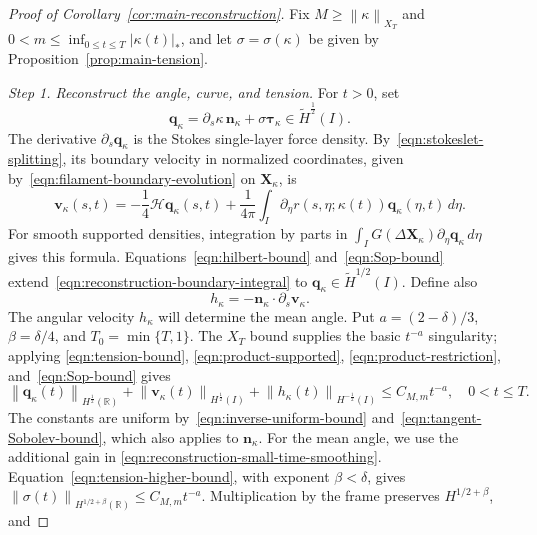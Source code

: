 \documentclass[11pt,reqno]{amsart}
\theoremstyle{plain}
\theoremstyle{definition}
\numberwithin{equation}{section}
\newcommand{\p}{\partial}
\newcommand{\mc}[1]{\mathcal{#1}}
\newcommand{\wt}[1]{\widetilde{#1}}
\newcommand{\bm}[1]{\boldsymbol{#1}}
\newcommand{\abs}[1]{\left\lvert #1 \right\rvert}
\newcommand{\norm}[1]{\left\lVert #1 \right\rVert}
\newcommand{\R}{\mathbb{R}}
\newcommand{\tk}{\bm\tau_\kappa}
\newcommand{\nk}{\bm n_\kappa}
\newcommand{\xk}{\bm X_\kappa}
\newcommand{\hi}[1]{H^{#1}(I)}
\newcommand{\thi}[1]{\wt H^{#1}(I)}
\newcommand{\hr}[1]{H^{#1}(\R)}
\begin{document}
\begin{proof}[Proof of Corollary~\ref{cor:main-reconstruction}]
Fix $M\ge\norm{\kappa}_{X_T}$ and
$0<m\le\inf_{0\le t\le T}\abs{\kappa(t)}_*$, and let
$\sigma=\sigma(\kappa)$ be given by
Proposition~\ref{prop:main-tension}.

\emph{Step 1. Reconstruct the angle, curve, and tension.}
For $t>0$, set
\begin{equation}\label{eqn:q-kappa-physical}
    \bm q_\kappa
    =\p_s\kappa\,\nk+\sigma\tk
    \in\thi{\frac12}.
\end{equation}
The derivative $\p_s\bm q_\kappa$ is the Stokes single-layer force
density. By~\eqref{eqn:stokeslet-splitting}, its boundary velocity in
normalized coordinates, given by~\eqref{eqn:filament-boundary-evolution}
on $\xk$, is
\begin{equation}\label{eqn:reconstruction-boundary-integral}
    \bm v_\kappa(s,t)
    =-\frac14\mc H\bm q_\kappa(s,t)
    +\frac{1}{4\pi}\int_I
        \p_\eta r(s,\eta;\kappa(t))\bm q_\kappa(\eta,t)\,d\eta.
\end{equation}
For smooth supported densities, integration by parts in
$\int_I G(\Delta\xk)\p_\eta\bm q_\kappa\,d\eta$ gives this formula.
Equations~\eqref{eqn:hilbert-bound} and~\eqref{eqn:Sop-bound} extend~\eqref{eqn:reconstruction-boundary-integral} to
$\bm q_\kappa\in\thi{1/2}$. Define also
\begin{equation}
    h_\kappa=-\nk\cdot\p_s\bm v_\kappa.
\end{equation}
The angular velocity $h_\kappa$ will determine the mean angle.
Put $a=(2-\delta)/3$, $\beta=\delta/4$, and $T_0=\min\{T,1\}$.
The $X_T$ bound supplies the basic $t^{-a}$ singularity; applying
\eqref{eqn:tension-bound}, \eqref{eqn:product-supported},
\eqref{eqn:product-restriction}, and~\eqref{eqn:Sop-bound} gives
\begin{equation}\label{eqn:reconstruction-time-bound}
    \norm{\bm q_\kappa(t)}_{\hr{\frac12}}
    +\norm{\bm v_\kappa(t)}_{\hi{\frac12}}
    +\norm{h_\kappa(t)}_{\hi{-\frac12}}
    \le C_{M,m}t^{-a},
    \quad 0<t\le T.
\end{equation}
The constants are uniform by~\eqref{eqn:inverse-uniform-bound} and~\eqref{eqn:tangent-Sobolev-bound}, which also applies to $\nk$.
For the mean angle, we use the additional gain in
\eqref{eqn:reconstruction-small-time-smoothing}.
Equation~\eqref{eqn:tension-higher-bound}, with exponent $\beta<\delta$,
gives $\norm{\sigma(t)}_{\hr{1/2+\beta}}\le C_{M,m}t^{-a}$.
Multiplication by the frame preserves $H^{1/2+\beta}$, and

\end{proof}
\end{document}
